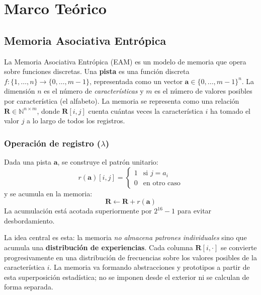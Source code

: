 \section{Marco Teórico}
\label{sec:marco_teorico}

\subsection{Memoria Asociativa Entrópica}
\label{sec:eam}

La Memoria Asociativa Entrópica (EAM) \cite{pineda2021entropic} es un modelo de memoria
que opera sobre funciones discretas.
Una \textbf{pista} es una función discreta $f : \{1, \ldots, n\} \to \{0, \ldots, m-1\}$,
representada como un vector $\mathbf{a} \in \{0, \ldots, m-1\}^n$.
La dimensión $n$ es el número de \emph{características} y $m$ es el número de valores posibles
por característica (el alfabeto).
La memoria se representa como una relación $\mathbf{R} \in \mathbb{N}^{n \times m}$,
donde $\mathbf{R}[i, j]$ cuenta cuántas veces la característica $i$ ha tomado el valor $j$ a
lo largo de todos los registros.

\subsubsection*{Operación de registro ($\lambda$)}

Dada una pista $\mathbf{a}$, se construye el patrón unitario:
\begin{equation}
    r(\mathbf{a})[i, j] = \begin{cases} 1 & \text{si } j = a_i \\ 0 & \text{en otro caso} \end{cases}
    \label{eq:patron-unitario}
\end{equation}
y se acumula en la memoria:
\begin{equation}
    \mathbf{R} \leftarrow \mathbf{R} + r(\mathbf{a})
    \label{eq:registro}
\end{equation}
La acumulación está acotada superiormente por $2^{16} - 1$ para evitar desbordamiento.

La idea central es esta: la memoria \emph{no almacena
patrones individuales} sino que acumula una \textbf{distribución de experiencias}.
Cada columna $\mathbf{R}[i, \cdot]$ se convierte progresivamente en una distribución de
frecuencias sobre los valores posibles de la característica $i$.
La memoria va formando abstracciones y prototipos a partir de esta superposición
estadística; no se imponen desde el exterior ni se calculan de forma separada.

